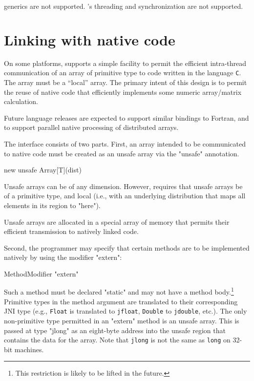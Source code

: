 \java{} generics are not supported.
\java{}'s threading and synchronization are not supported.

\fi

\chapter{Linking with native code}\label{extern}

On some platforms,
\XtenCurrVer{} supports a simple facility to permit the efficient
intra-thread communication of an array of primitive type to code
written in the language {\tt C}.  The array must be a ``local''
array. The primary intent of this design is to permit the reuse of
native code that efficiently implements some numeric array/matrix
calculation.

Future language releases are expected to support similar bindings to
{\sc Fortran}, and to support parallel native processing of
distributed \Xten{} arrays. 

The interface consists of two parts. First, an array intended to be
communicated to native code must be created as an unsafe array
via the \xcd"unsafe" annotation.
\begin{xten}
new unsafe Array[T](dist)
\end{xten}
Unsafe arrays can be of any dimension. However, \XtenCurrVer{}
requires that unsafe arrays be of a primitive type, and local
(i.e.,
with an underlying distribution that maps all elements in its region
to \xcd"here").

Unsafe arrays are allocated in a special array of memory that permits
their efficient transmission to natively linked code.

Second, the \Xten{} programmer may specify that certain methods are to
be implemented natively by using the modifier \xcd"extern":

\begin{grammar}
   MethodModifier \: \xcd"extern"
\end{grammar}

Such a method must be declared \xcd"static" and may not have a
method body.\footnote{This
restriction is likely to be lifted in the future.}  Primitive types in
the method argument are translated to their corresponding JNI type
(e.g., {\tt Float} is translated to {\tt jfloat}, {\tt Double} to
{\tt jdouble}, etc.).  The only non-primitive type permitted in an
\xcd"extern" method is an unsafe array. This is passed at type
\xcd"jlong" as an eight-byte address into the unsafe region that contains
the data for the array.  Note that {\tt jlong} is not the same as {\tt long} on
32-bit machines.


